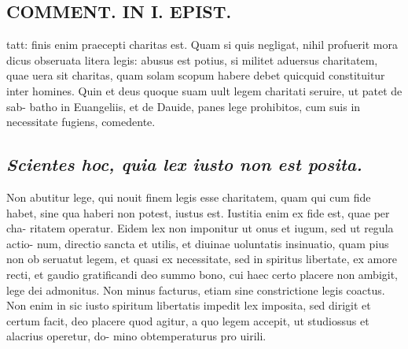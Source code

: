 \documentclass{article}
\begin{document}
\begin{pages}
\section*{COMMENT. IN I. EPIST. }
\marginpar{[ p.470 ]}\pstart tatt: finis enim praecepti charitas est. Quam si quis negligat, nihil profuerit mora dicus obseruata litera legis: abusus est potius, si militet aduersus charitatem, quae uera sit charitas, quam solam scopum habere debet quicquid constituitur inter homines. Quin et deus quoque suam uult legem charitati seruire, ut patet de sab- batho in Euangeliis, et de Dauide, panes lege prohibitos, cum suis in necessitate fugiens, comedente.  \pend
{}
{}
\subsection*{\textit{Scientes hoc, quia lex iusto non est posita. }}\pstart Non abutitur lege, qui nouit finem legis esse charitatem, quam qui cum fide habet, sine qua haberi non potest, iustus est. Iustitia enim ex fide est, quae per cha- ritatem operatur. Eidem lex non imponitur ut onus et iugum, sed ut regula actio- num, directio sancta et utilis, et diuinae uoluntatis insinuatio, quam pius non ob seruatut legem, et quasi ex necessitate, sed in spiritus libertate, ex amore recti, et gaudio gratificandi deo summo bono, cui haec certo placere non ambigit, lege dei admonitus. Non minus facturus, etiam sine constrictione legis coactus. Non enim in sic iusto spiritum libertatis impedit lex imposita, sed dirigit et certum facit, deo placere quod agitur, a quo legem accepit, ut studiossus et alacrius operetur, do- mino obtemperaturus pro uirili.  \pend
{}
{}

\end{pages}
\end{document}
